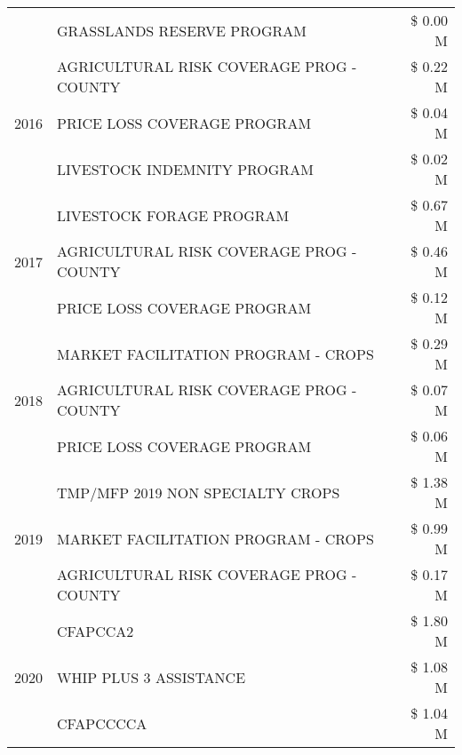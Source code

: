 \begin{tabular}{llr}
 & GRASSLANDS RESERVE PROGRAM & \$ 0.00 M \\
\cline{1-3}
\multirow[t]{3}{*}{2016} & AGRICULTURAL RISK COVERAGE PROG - COUNTY & \$ 0.22 M \\
 & PRICE LOSS COVERAGE PROGRAM & \$ 0.04 M \\
 & LIVESTOCK INDEMNITY PROGRAM & \$ 0.02 M \\
\cline{1-3}
\multirow[t]{3}{*}{2017} & LIVESTOCK FORAGE PROGRAM & \$ 0.67 M \\
 & AGRICULTURAL RISK COVERAGE PROG - COUNTY & \$ 0.46 M \\
 & PRICE LOSS COVERAGE PROGRAM & \$ 0.12 M \\
\cline{1-3}
\multirow[t]{3}{*}{2018} & MARKET FACILITATION PROGRAM - CROPS & \$ 0.29 M \\
 & AGRICULTURAL RISK COVERAGE PROG - COUNTY & \$ 0.07 M \\
 & PRICE LOSS COVERAGE PROGRAM & \$ 0.06 M \\
\cline{1-3}
\multirow[t]{3}{*}{2019} & TMP/MFP 2019 NON SPECIALTY CROPS & \$ 1.38 M \\
 & MARKET FACILITATION PROGRAM - CROPS & \$ 0.99 M \\
 & AGRICULTURAL RISK COVERAGE PROG - COUNTY & \$ 0.17 M \\
\cline{1-3}
\multirow[t]{3}{*}{2020} & CFAPCCA2 & \$ 1.80 M \\
 & WHIP PLUS 3 ASSISTANCE & \$ 1.08 M \\
 & CFAPCCCCA & \$ 1.04 M \\
\cline{1-3}
\bottomrule
\end{tabular}
